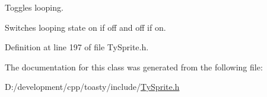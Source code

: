 Toggles looping. 

Switches looping state on if off and off if on. 

Definition at line 197 of file TySprite.h.



The documentation for this class was generated from the following file:\begin{DoxyCompactItemize}
\item 
D:/development/cpp/toasty/include/\hyperlink{_ty_sprite_8h}{TySprite.h}\end{DoxyCompactItemize}
